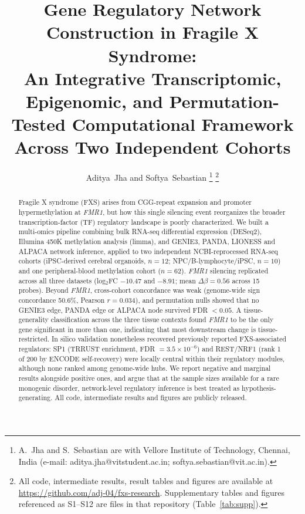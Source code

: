 \documentclass[journal]{IEEEtran}
\newcommand{\gene}[1]{\textit{#1}}
\begin{document}
\title{Gene Regulatory Network Construction in Fragile X Syndrome:\\
An Integrative Transcriptomic, Epigenomic, and Permutation-Tested Computational Framework Across Two Independent Cohorts}

\author{Aditya~Jha and Softya~Sebastian%
\thanks{A.~Jha and S.~Sebastian are with Vellore Institute of Technology, Chennai, India (e-mail: aditya.jha@vitstudent.ac.in; softya.sebastian@vit.ac.in).}%
\thanks{All code, intermediate results, result tables and figures are available at \url{https://github.com/adj-04/fxs-research}. Supplementary tables and figures referenced as S1--S12 are files in that repository (Table~\ref{tab:supp}).}}

\maketitle

\begin{abstract}
Fragile X syndrome (FXS) arises from CGG-repeat expansion and promoter hypermethylation at \gene{FMR1}, but how this single silencing event reorganizes the broader transcription-factor (TF) regulatory landscape is poorly characterized. We built a multi-omics pipeline combining bulk RNA-seq differential expression (DESeq2), Illumina 450K methylation analysis (limma), and GENIE3, PANDA, LIONESS and ALPACA network inference, applied to two independent NCBI-reprocessed RNA-seq cohorts (iPSC-derived cerebral organoids, $n=12$; NPC/B-lymphocyte/iPSC, $n=10$) and one peripheral-blood methylation cohort ($n=62$). \gene{FMR1} silencing replicated across all three datasets (log$_2$FC $-10.47$ and $-8.91$; mean $\Delta\beta=0.56$ across 15 probes). Beyond \gene{FMR1}, cross-cohort concordance was weak (genome-wide sign concordance 50.6\%, Pearson $r=0.034$), and permutation nulls showed that no GENIE3 edge, PANDA edge or ALPACA node survived FDR $<0.05$. A tissue-generality classification across the three tissue contexts found \gene{FMR1} to be the only gene significant in more than one, indicating that most downstream change is tissue-restricted. In silico validation nonetheless recovered previously reported FXS-associated regulators: SP1 (TRRUST enrichment, FDR $=3.5\times10^{-6}$) and REST/NRF1 (rank 1 of 200 by ENCODE self-recovery) were locally central within their regulatory modules, although none ranked among genome-wide hubs. We report negative and marginal results alongside positive ones, and argue that at the sample sizes available for a rare monogenic disorder, network-level regulatory inference is best treated as hypothesis-generating. All code, intermediate results and figures are publicly released.
\end{abstract}
\end{document}

